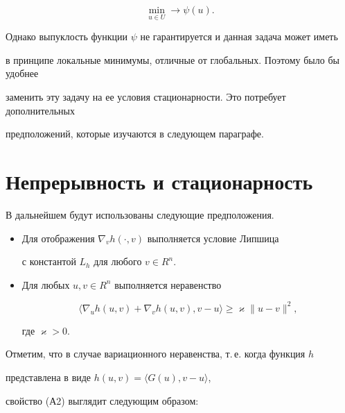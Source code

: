 \begin{equation}\label{minpsi}


\min \limits_{u \in U} \longrightarrow \psi(u).


\end{equation}


Однако выпуклость функции $\psi$ не гарантируется и данная задача может иметь


в принципе локальные минимумы, отличные от глобальных. Поэтому было бы удобнее


заменить эту задачу на ее условия стационарности. Это потребует дополнительных 


предположений, которые изучаются в следующем параграфе.





\section{Непрерывность и стационарность}





В дальнейшем будут использованы следующие предположения.


\begin{itemize}


\item[(A1)] Для отображения $\nabla_v h(\cdot,v)$ выполняется условие Липшица 


с константой $L_h$ для любого $v \in R^n$.


\item[(A2)] Для любых $u, v \in R^n$ выполняется неравенство


$$


\langle \nabla_u h(u,v) + \nabla_v h(u,v), v - u\rangle


\ge \varkappa \|u - v\|^2,


$$


где $\varkappa > 0$.


\end{itemize}





Отметим, что в случае вариационного неравенства, т.\,е. когда функция $h$ 


представлена в виде $h(u,v)= \langle G(u), v-u \rangle$,


свойство (А2) выглядит следующим образом:


$$


